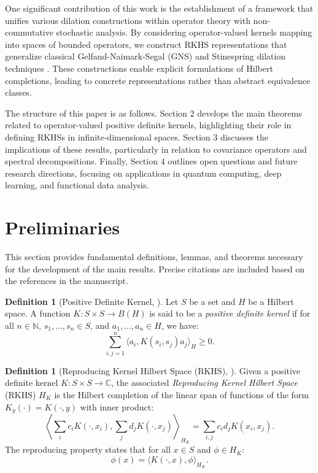 \documentclass[11pt]{amsart}
\theoremstyle{definition}
\newtheorem{definition}[theorem]{Definition}
\numberwithin{equation}{section}
\begin{document}
One significant contribution of this work is the establishment of a framework that unifies various dilation constructions within operator theory with non-commutative stochastic analysis. By considering operator-valued kernels mapping into spaces of bounded operators, we construct RKHS representations that generalize classical Gelfand-Naimark-Segal (GNS) and Stinespring dilation techniques \cite{Gelfand2004}. These constructions enable explicit formulations of Hilbert completions, leading to concrete representations rather than abstract equivalence classes.

The structure of this paper is as follows. Section 2 develops the main theorems related to operator-valued positive definite kernels, highlighting their role in defining RKHSs in infinite-dimensional spaces. Section 3 discusses the implications of these results, particularly in relation to covariance operators and spectral decompositions. Finally, Section 4 outlines open questions and future research directions, focusing on applications in quantum computing, deep learning, and functional data analysis.


\section{Preliminaries}

This section provides fundamental definitions, lemmas, and theorems necessary for the development of the main results. Precise citations are included based on the references in the manuscript.

\begin{definition}[Positive Definite Kernel, \cite{Jorgensen2024}]
Let $S$ be a set and $H$ be a Hilbert space. A function $K: S \times S \to B(H)$ is said to be a \emph{positive definite kernel} if for all $n \in \mathbb{N}$, $s_1, \dots, s_n \in S$, and $a_1, \dots, a_n \in H$, we have:
\[
    \sum_{i,j=1}^{n} \langle a_i, K(s_i, s_j) a_j \rangle_H \geq 0.
\]
\end{definition}

\begin{definition}[Reproducing Kernel Hilbert Space (RKHS), \cite{Aronszajn1950}]
Given a positive definite kernel $K: S \times S \to \mathbb{C}$, the associated \emph{Reproducing Kernel Hilbert Space} (RKHS) $H_K$ is the Hilbert completion of the linear span of functions of the form $K_y(\cdot) = K(\cdot, y)$ with inner product:
\[
    \left\langle \sum_{i} c_i K(\cdot, x_i), \sum_{j} d_j K(\cdot, x_j) \right\rangle_{H_K} = \sum_{i,j} c_i d_j K(x_i, x_j).
\]
The reproducing property states that for all $x \in S$ and $\phi \in H_K$:
\[
    \phi(x) = \langle K(\cdot, x), \phi \rangle_{H_K}.
\]
\end{definition}
\end{document}
